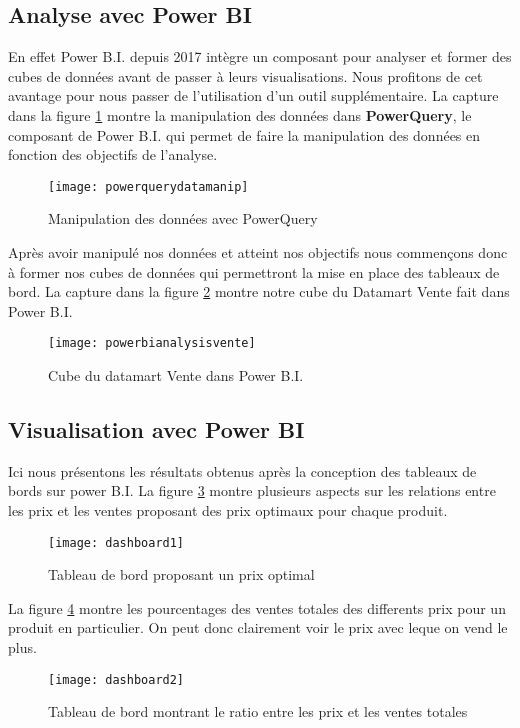 \subsection{Analyse avec Power BI}
En effet Power B.I. depuis 2017 intègre un composant pour analyser et former des cubes de données avant de passer à leurs visualisations. Nous profitons de cet avantage pour nous passer de l’utilisation d’un outil supplémentaire. La capture dans la figure \ref{fig:powerquerydatamanip} montre la manipulation des données dans \textbf{PowerQuery}, le composant de Power B.I. qui permet de faire la manipulation des données en fonction des objectifs de l’analyse.
\begin{figure}[H]
    \centering
    \texttt{[image: powerquerydatamanip]}
    \caption{Manipulation des données avec PowerQuery}
    \label{fig:powerquerydatamanip}
\end{figure}
Après avoir manipulé nos données et atteint nos objectifs nous commençons donc à former nos cubes de données qui permettront la mise en place des tableaux de bord. La capture dans la figure \ref{fig:powerbianalysisvente} montre notre cube du Datamart Vente fait dans Power B.I.

\begin{figure}[H]
    \centering
    \texttt{[image: powerbianalysisvente]}
    \caption{Cube du datamart Vente dans Power B.I.}
    \label{fig:powerbianalysisvente}
\end{figure}

\subsection{Visualisation avec Power BI}
Ici nous présentons les résultats obtenus après la conception des tableaux de bords sur power B.I. La figure \ref{fig:dashboard1} montre plusieurs aspects sur les relations entre les prix et les ventes proposant des prix optimaux pour chaque produit.
\begin{figure}[H]
    \centering
    \texttt{[image: dashboard1]}
    \caption{Tableau de bord proposant un prix optimal}
    \label{fig:dashboard1}
\end{figure}

La figure \ref{fig:dashboard2} montre les pourcentages des ventes totales des differents prix pour un produit en particulier. On peut donc clairement voir le prix avec leque on vend le plus.
\begin{figure}[H]
    \centering
    \texttt{[image: dashboard2]}
    \caption{Tableau de bord montrant le ratio entre les prix et les ventes totales}
    \label{fig:dashboard2}
\end{figure}

